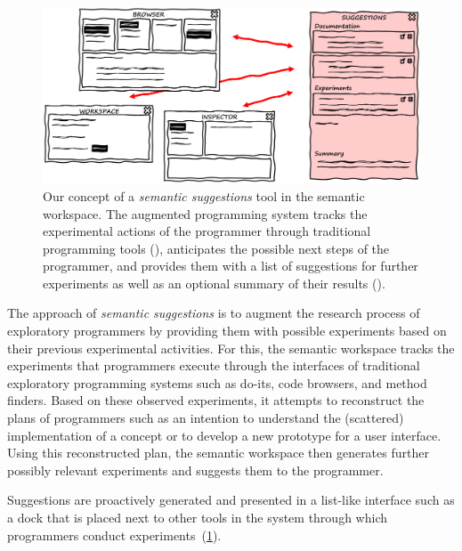 \begin{figure}
	\centering
	\includegraphics[width=\textwidth]{02_workspace/suggestions.png}
	\caption[Our concept of a \emph{semantic suggestions} tool in the semantic workspace.]{
		Our concept of a \emph{semantic suggestions} tool in the semantic workspace.
		The augmented programming system tracks the experimental actions of the programmer through traditional programming tools (\bold{\textcolor{gray}{gray}}), anticipates the possible next steps of the programmer, and provides them with a list of suggestions for further experiments as well as an optional summary of their results (\bold{\textcolor[HTML]{c00000}{red}}).
	}
	\label{fig:approach/workspace/suggestions}
\end{figure}

The approach of \emph{semantic suggestions} is to augment the research process of exploratory programmers by providing them with possible experiments based on their previous experimental activities.
For this, the semantic workspace tracks the experiments that programmers execute through the interfaces of traditional exploratory programming systems such as do-its, code browsers, and method finders.
Based on these observed experiments, it attempts to reconstruct the plans of programmers such as an intention to understand the (scattered) implementation of a concept or to develop a new prototype for a user interface.
Using this reconstructed plan, the semantic workspace then generates further possibly relevant experiments and suggests them to the programmer.

Suggestions are proactively generated and presented in a list-like interface such as a dock that is placed next to other tools in the system through which programmers conduct experiments~(\cref{fig:approach/workspace/suggestions}).

